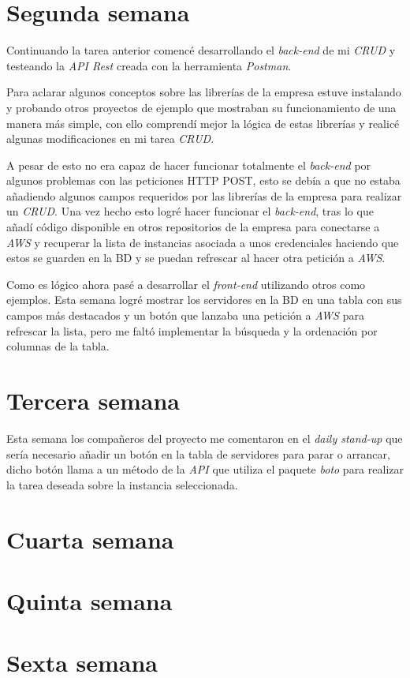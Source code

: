\section{Segunda semana}

Continuando la tarea anterior comencé desarrollando el \textit{back-end} de mi \textit{CRUD} y testeando la \textit{API Rest} creada con la herramienta \textit{Postman}.

Para aclarar algunos conceptos sobre las librerías de la empresa estuve instalando y probando otros proyectos de ejemplo que mostraban su funcionamiento de una manera más simple, con ello comprendí mejor la lógica de estas librerías y realicé algunas modificaciones en mi tarea \textit{CRUD}. 

A pesar de esto no era capaz de hacer funcionar totalmente el \textit{back-end} por algunos problemas con las peticiones HTTP POST, esto se debía a que no estaba añadiendo algunos campos requeridos por las librerías de la empresa para realizar un \textit{CRUD}. Una vez hecho esto logré hacer funcionar el \textit{back-end}, tras lo que añadí código disponible en otros repositorios de la empresa para conectarse a \textit{AWS} y recuperar la lista de instancias asociada a unos credenciales haciendo que estos se guarden en la BD y se puedan refrescar al hacer otra petición a \textit{AWS}.

Como es lógico ahora pasé a desarrollar el \textit{front-end} utilizando otros como ejemplos. Esta semana logré mostrar los servidores en la BD en una tabla con sus campos más destacados y un botón que lanzaba una petición a \textit{AWS} para refrescar la lista, pero me faltó implementar la búsqueda y la ordenación por columnas de la tabla.
 
\section{Tercera semana}

Esta semana los compañeros del proyecto me comentaron en el \textit{daily stand-up} que sería necesario añadir un botón en la tabla de servidores para parar o arrancar, dicho botón llama a un método de la \textit{API} que utiliza el paquete \textit{boto} para realizar la tarea deseada sobre la instancia seleccionada.

\section{Cuarta semana}

\section{Quinta semana}

\section{Sexta semana}
